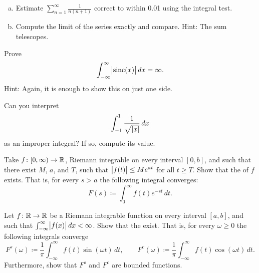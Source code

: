 \begin{exercise}
\leavevmode
\begin{enumerate}[a)]
\item
Estimate $\sum_{n=1}^\infty \frac{1}{n(n+1)}$ correct to within 0.01
using the integral test.
\item
Compute the limit of the series exactly
and compare.  Hint: The sum telescopes.
\end{enumerate}
\end{exercise}

\begin{exercise}
Prove 
\begin{equation*}
\int_{-\infty}^\infty \bigl\lvert {\operatorname{sinc}(x)} \bigr\rvert\,dx = \infty .
\end{equation*}
Hint: Again, it is enough to show this on just one side.
\end{exercise}

\begin{exercise}
Can you interpret
\begin{equation*}
\int_{-1}^1 \frac{1}{\sqrt{\lvert {x} \rvert}}\,dx
\end{equation*}
as an improper integral?  If so, compute its value.
\end{exercise}

\begin{exercise}
Take $f \colon [0,\infty) \to {\mathbb{R}}$, Riemann integrable on
every interval $[0,b]$, and such that there exist $M$, $a$, and $T$,
such that $\bigl\lvert {f(t)} \bigr\rvert \leq M e^{at}$ for all $t \geq T$.  Show that the
\emph{} of $f$ exists.  That is, for
every $s > a$ the following integral converges:
\begin{equation*}
F(s) \coloneqq \int_{0}^\infty f(t) e^{-st} \,dt .
\end{equation*}
\end{exercise}

\begin{exercise}
Let $f \colon {\mathbb{R}} \to {\mathbb{R}}$ be a Riemann integrable function
on every interval $[a,b]$, and such
that $\int_{-\infty}^\infty \bigl\lvert {f(x)} \bigr\rvert\,dx < \infty$.  Show that the
\emph{}
exist.  That is, for every $\omega \geq 0$ the
following integrals converge
\begin{equation*}
F^s(\omega) \coloneqq \frac{1}{\pi} \int_{-\infty}^\infty f(t) \sin(\omega t) \,dt ,
\qquad
F^c(\omega) \coloneqq \frac{1}{\pi} \int_{-\infty}^\infty f(t) \cos(\omega t) \,dt .
\end{equation*}
Furthermore, show that $F^s$ and $F^c$ are bounded functions.
\end{exercise}

